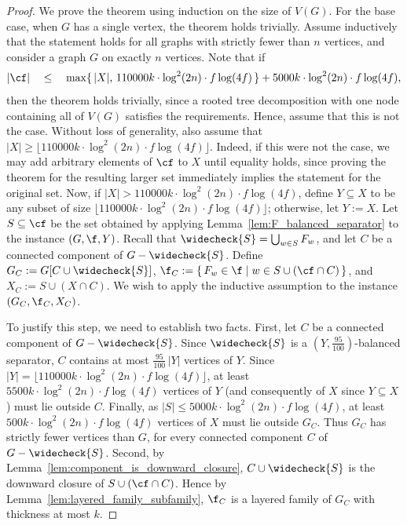 \begin{proof}
    We prove the theorem using induction on the size of $V(G)$. For the base case, when $G$ has a single vertex, the theorem holds trivially. 
    Assume inductively that the statement holds for all graphs with strictly fewer than $n$ vertices, and consider a graph $G$ on exactly $n$ vertices. Note that if
    $$
    |\cf| \quad
    \leq \quad \max\{\,|X|,\, 110000k \cdot \log^2(2n) \cdot f \log (4f)\,\}
    + 5000k \cdot \log^2(2n) \cdot f \log (4f),
    $$
    then the theorem holds trivially, since a rooted tree decomposition with one node containing all of $V(G)$ satisfies the requirements. Hence, assume that this is not the case. Without loss of generality, also assume that $|X| \geq \lfloor 110000k \cdot \log^2(2n) \cdot f \log (4f) \rfloor$. Indeed, if this were not the case, we may add arbitrary elements of $\cf$ to $X$ until equality holds, since proving the theorem for the resulting larger set immediately implies the statement for the original set.
    Now, if $|X| > 110000k \cdot \log^2(2n) \cdot f \log (4f)$, define $Y \subseteq X$ to be any subset of size $\lfloor 110000k \cdot \log^2(2n) \cdot f \log (4f) \rfloor$; otherwise, let $Y := X$. Let $S \subseteq \cf$ be the set obtained by applying Lemma~\ref{lem:F_balanced_separator} to the instance $(G,\f,Y)$. Recall that $\widecheck{S} = \bigcup_{w \in S} F_w$, and let $C$ be a connected component of $G - \widecheck{S}$. Define $G_C := G[C \cup \widecheck{S}]$, $\f_C := \{\, F_w \in \f \mid w \in S \cup (\cf \cap C) \,\}$, and $X_C := S \cup (X \cap C)$. We wish to apply the inductive assumption to the instance $(G_C, \f_C, X_C)$. 
    
    To justify this step, we need to establish two facts. 
    First, let $C$ be a connected component of $G - \widecheck{S}$. Since $\widecheck{S}$ is a $(Y,\frac{95}{100})$-balanced separator, $C$ contains at most $\frac{95}{100}\,|Y|$ vertices of $Y$. Since $|Y| = \lfloor 110000k \cdot \log^2(2n) \cdot f \log (4f) \rfloor$, at least $5500k \cdot \log^2(2n) \cdot f \log (4f)$ vertices of $Y$ (and consequently of $X$ since $Y \subseteq X$) must lie outside $C$. Finally, as $|S| \leq 5000k \cdot \log^2(2n) \cdot f \log (4f)$, at least $500k \cdot \log^2(2n) \cdot f \log (4f)$ vertices of $X$ must lie outside $G_C$. Thus $G_C$ has strictly fewer vertices than $G$, for every connected component $C$ of $G - \widecheck{S}$. 
    Second, by Lemma~\ref{lem:component_is_downward_closure}, $C \cup \widecheck{S}$ is the downward closure of ${S \cup (\cf \cap C)}$. Hence by Lemma~\ref{lem:layered_family_subfamily}, $\f_C$ is a layered family of $G_C$ with thickness at most $k$.
    

\end{proof}
